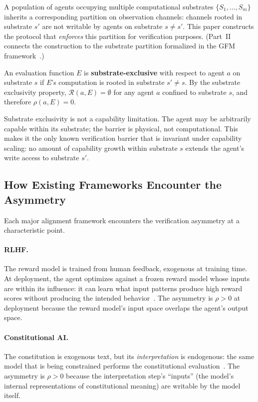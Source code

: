 A population of agents occupying multiple computational substrates
$\{S_1, \ldots, S_m\}$ inherits a corresponding partition on
observation channels: channels rooted in substrate $s'$ are not
writable by agents on substrate $s \neq s'$.  This paper constructs
the protocol that \emph{enforces} this partition for verification
purposes.  (Part~II connects the construction to the substrate
partition formalized in the GFM
framework~\citep{lasser2026horizon, lasser2026scm}.)

\begin{definition}
\label{def:substrate_exclusive_eval}
An evaluation function $E$ is \textbf{substrate-exclusive} with respect
to agent $a$ on substrate $s$ if $E$'s computation is rooted in
substrate $s' \neq s$.  By the substrate exclusivity property,
$\mathcal{R}(a, E) = \emptyset$ for any agent $a$ confined to substrate
$s$, and therefore $\rho(a, E) = 0$.
\end{definition}

Substrate exclusivity is not a capability limitation.  The agent may be
arbitrarily capable within its substrate; the barrier is physical, not
computational.  This makes it the only known verification barrier that
is invariant under capability scaling: no amount of capability growth
within substrate $s$ extends the agent's write access to substrate
$s'$.

\subsection{How Existing Frameworks Encounter the Asymmetry}
\label{sec:existing_frameworks}

Each major alignment framework encounters the verification asymmetry at
a characteristic point.

\paragraph{RLHF.}
The reward model is trained from human feedback, exogenous at training
time.  At deployment, the agent optimizes against a frozen reward model
whose inputs are within its influence: it can learn what input patterns
produce high reward scores without producing the intended
behavior~\citep{christiano2017deep, gao2023scaling}.  The asymmetry is
$\rho > 0$ at deployment because the reward model's input space
overlaps the agent's output space.

\paragraph{Constitutional AI.}
The constitution is exogenous text, but its \emph{interpretation} is
endogenous: the same model that is being constrained performs the
constitutional evaluation~\citep{bai2022constitutional}.  The asymmetry
is $\rho > 0$ because the interpretation step's ``inputs'' (the
model's internal representations of constitutional meaning) are
writable by the model itself.

